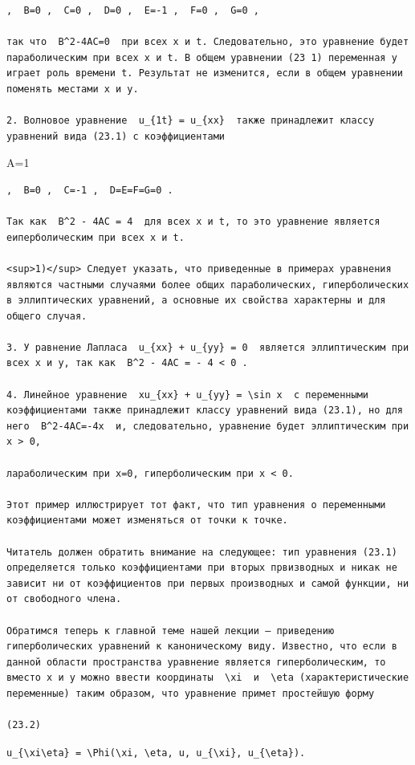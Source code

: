 \documentclass[
  ukrainian,
]{article}
\begin{document}
\begin{verbatim}
,  B=0 ,  C=0 ,  D=0 ,  E=-1 ,  F=0 ,  G=0 ,

так что  B^2-4AC=0  при всех x и t. Следовательно, это уравнение будет параболическим при всех x и t. В общем уравнении (23 1) переменная y играет роль времени t. Результат не изменится, если в общем уравнении поменять местами x и y.

2. Волновое уравнение  u_{1t} = u_{xx}  также принадлежит классу уравнений вида (23.1) с коэффициентами
\end{verbatim}

A=1

\begin{verbatim}
,  B=0 ,  C=-1 ,  D=E=F=G=0 .

Так как  B^2 - 4AC = 4  для всех x и t, то это уравнение является еиперболическим при всех x и t.

<sup>1)</sup> Следует указать, что приведенные в примерах уравнения являются частными случаями более общих параболических, гиперболических в эллиптических уравнений, а основные их свойства характерны и для общего случая.

3. У равнение Лапласа  u_{xx} + u_{yy} = 0  является эллиптическим при всех x и y, так как  B^2 - 4AC = - 4 < 0 .

4. Линейное уравнение  xu_{xx} + u_{yy} = \sin x  с переменными коэффициентами также принадлежит классу уравнений вида (23.1), но для него  B^2-4AC=-4x  и, следовательно, уравнение будет эллиптическим при x > 0,

лараболическим при x=0, гиперболическим при x < 0.

Этот пример иллюстрирует тот факт, что тип уравнения о переменными коэффициентами может изменяться от точки к точке.

Читатель должен обратить внимание на следующее: тип уравнения (23.1) определяется только коэффициентами при вторых првизводных и никак не зависит ни от коэффициентов при первых производных и самой функции, ни от свободного члена.

Обратимся теперь к главной теме нашей лекции — приведению гиперболических уравнений к каноническому виду. Известно, что если в данной области пространства уравнение является гиперболическим, то вместо x и y можно ввести координаты  \xi  и  \eta (характеристические переменные) таким образом, что уравнение примет простейшую форму

(23.2)
\end{verbatim}

\texttt{u\_\{\textbackslash{}xi\textbackslash{}eta\}\ =\ \textbackslash{}Phi(\textbackslash{}xi,\ \textbackslash{}eta,\ u,\ u\_\{\textbackslash{}xi\},\ u\_\{\textbackslash{}eta\}).}
\end{document}
